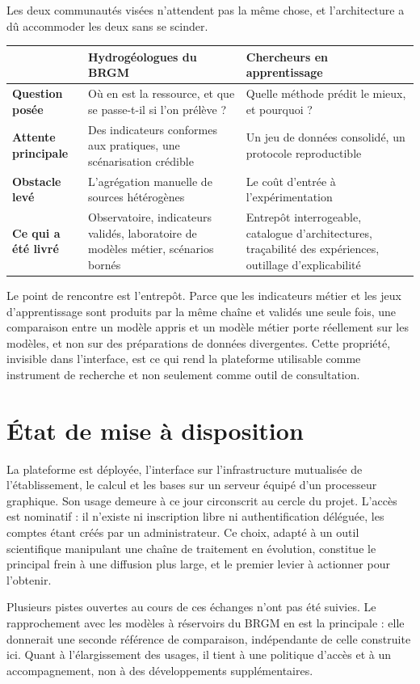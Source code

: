 Les deux communautés visées n'attendent pas la même chose, et l'architecture a dû accommoder les
deux sans se scinder.

\begin{center}
\begin{tabularx}{\textwidth}{@{}p{3.6cm}XX@{}}
\toprule
 & \textbf{Hydrogéologues du BRGM} & \textbf{Chercheurs en apprentissage} \\
\midrule
\textbf{Question posée} & Où en est la ressource, et que se passe-t-il si l'on prélève ? &
Quelle méthode prédit le mieux, et pourquoi ? \\
\textbf{Attente principale} & Des indicateurs conformes aux pratiques, une scénarisation
crédible & Un jeu de données consolidé, un protocole reproductible \\
\textbf{Obstacle levé} & L'agrégation manuelle de sources hétérogènes & Le coût d'entrée à
l'expérimentation \\
\textbf{Ce qui a été livré} & Observatoire, indicateurs validés, laboratoire de modèles métier,
scénarios bornés & Entrepôt interrogeable, catalogue d'architectures, traçabilité des
expériences, outillage d'explicabilité \\
\bottomrule
\end{tabularx}
\end{center}

Le point de rencontre est l'entrepôt. Parce que les indicateurs métier et les jeux
d'apprentissage sont produits par la même chaîne et validés une seule fois, une comparaison
entre un modèle appris et un modèle métier porte réellement sur les modèles, et non sur des
préparations de données divergentes. Cette propriété, invisible dans l'interface, est ce qui rend
la plateforme utilisable comme instrument de recherche et non seulement comme outil de
consultation.

\section{État de mise à disposition}

La plateforme est déployée, l'interface sur l'infrastructure mutualisée de l'établissement, le
calcul et les bases sur un serveur équipé d'un processeur graphique. Son usage demeure à ce
jour circonscrit au cercle du projet. L'accès est nominatif : il n'existe ni inscription libre ni
authentification déléguée, les comptes étant créés par un administrateur. Ce choix, adapté à un
outil scientifique manipulant une chaîne de traitement en évolution, constitue le principal frein
à une diffusion plus large, et le premier levier à actionner pour l'obtenir.

Plusieurs pistes ouvertes au cours de ces échanges n'ont pas été suivies. Le rapprochement avec
les modèles à réservoirs du BRGM en est la principale : elle donnerait une seconde référence de
comparaison, indépendante de celle construite ici. Quant à l'élargissement des usages, il tient à
une politique d'accès et à un accompagnement, non à des développements supplémentaires.
